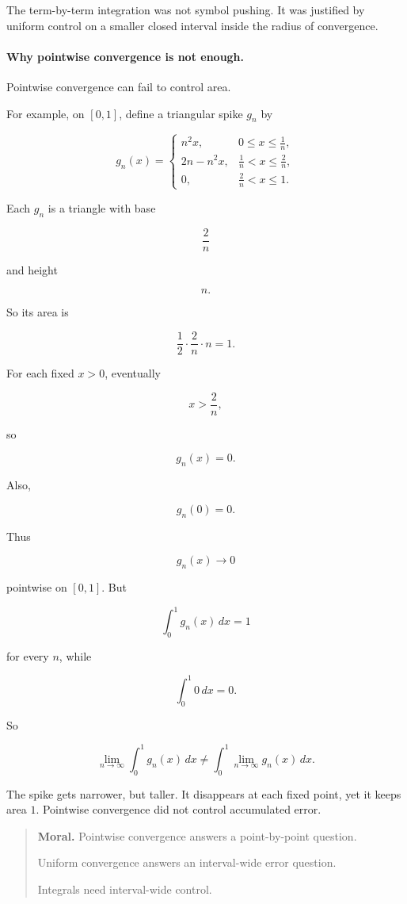 The term-by-term integration was not symbol pushing.  It was justified by uniform
control on a smaller closed interval inside the radius of convergence.

\paragraph{Why pointwise convergence is not enough.}
Pointwise convergence can fail to control area.

For example, on \([0,1]\), define a triangular spike \(g_n\) by

\[
g_n(x)=
\begin{cases}
n^2x, & 0\le x\le \frac1n,\\
2n-n^2x, & \frac1n<x\le \frac2n,\\
0, & \frac2n<x\le1.
\end{cases}
\]

Each \(g_n\) is a triangle with base

\[
\frac2n
\]

and height

\[
n.
\]

So its area is

\[
\frac12\cdot \frac2n\cdot n=1.
\]

For each fixed \(x>0\), eventually

\[
x>\frac2n,
\]

so

\[
g_n(x)=0.
\]

Also,

\[
g_n(0)=0.
\]

Thus

\[
g_n(x)\to0
\]

pointwise on \([0,1]\).  But

\[
\int_0^1 g_n(x)\,dx=1
\]

for every \(n\), while

\[
\int_0^1 0\,dx=0.
\]

So

\[
\lim_{n\to\infty}\int_0^1 g_n(x)\,dx
\neq
\int_0^1 \lim_{n\to\infty}g_n(x)\,dx.
\]

The spike gets narrower, but taller.  It disappears at each fixed point, yet it keeps area
\(1\).  Pointwise convergence did not control accumulated error.

\begin{quote}
\textbf{Moral.}
Pointwise convergence answers a point-by-point question.

Uniform convergence answers an interval-wide error question.

Integrals need interval-wide control.
\end{quote}


